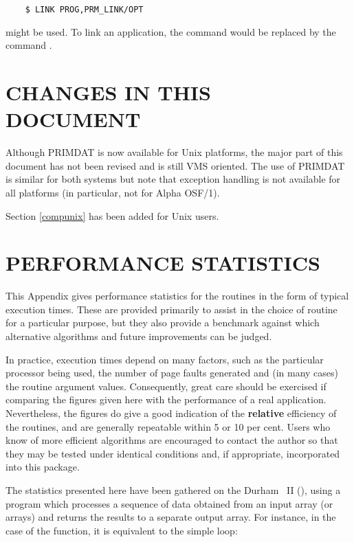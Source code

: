 \begin{verbatim}
    $ LINK PROG,PRM_LINK/OPT
\end{verbatim}

might be used.
To link an  application, the  command would be
replaced by the  command . 

\section{CHANGES IN THIS DOCUMENT}
Although PRIMDAT is now available for Unix platforms, the major part of this
document has not been revised and is still VMS oriented. 
The use of PRIMDAT is similar for both systems but note that exception
handling is not available for all platforms (in particular, not for 
Alpha OSF/1).

Section \ref{compunix} has been added for Unix users.

\appendix

\newpage

\section{PERFORMANCE STATISTICS}

\label{appendix:statistics}

This Appendix gives performance statistics for the  routines
in the form of typical execution times. 
These are provided primarily to assist in the choice of routine for a 
particular purpose, but they also provide a benchmark against which 
alternative algorithms and future improvements can be judged.

In practice, execution times depend on many factors, such as the
particular processor being used, the number of page faults generated
and (in many cases) the routine argument values.
Consequently, great care should be exercised if comparing the figures given
here with the performance of a real application.
Nevertheless, the figures do give a good indication of the {\bf relative}
efficiency of the routines, and are generally repeatable within 5 or 10 per
cent. 
Users who know of more efficient algorithms are encouraged to contact the
author so that they may be tested under identical conditions and, if
appropriate, incorporated into this package. 

The statistics presented here have been gathered on the Durham
~II (), using a program which processes a
sequence of data obtained from an input array (or arrays) and returns the
results to a separate output array. 
For instance, in the case of the  function, it is equivalent 
to the simple loop:

